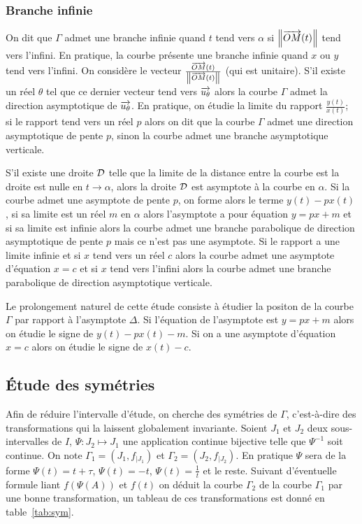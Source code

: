 \subsubsection{Branche infinie}

On dit que \(\Gamma\) admet une branche infinie quand \(t\) tend vers \(\alpha\)
si \(\left\lVert\overrightarrow{OM}(t)\right\rVert\) tend vers l'infini. En pratique, la courbe présente
une branche infinie quand \(x\) ou \(y\) tend vers l'infini. On considère le
vecteur \(\frac{\overrightarrow{OM}(t)}{\left\lVert\overrightarrow{OM}(t)\right\rVert}\) (qui est unitaire). S'il
existe un réel \(\theta\) tel que ce dernier vecteur tend vers
\(\overrightarrow{u_\theta}\) alors la courbe \(\Gamma\) admet la direction asymptotique
de \(\overrightarrow{u_\theta}\). En pratique, on étudie la limite du rapport
\(\frac{y(t)}{x(t)}\); si le rapport tend vers un réel \(p\) alors on dit que la
courbe \(\Gamma\) admet une direction asymptotique de pente \(p\), sinon la
courbe admet une branche asymptotique verticale.

S'il existe une droite \(\mathcal{D}\) telle que la limite de la distance entre la
courbe est la droite est nulle en \(t \to \alpha\), alors la droite \(\mathcal{D}\) est
asymptote à la courbe en \(\alpha\). Si la courbe admet une asymptote de pente
\(p\), on forme alors le terme \(y(t) - px(t)\), si sa limite est un réel \(m\)
en \(\alpha\) alors l'asymptote a pour équation \(y = px + m\) et si sa limite
est infinie alors la courbe admet une branche parabolique de direction
asymptotique de pente \(p\) mais ce n'est pas une asymptote. Si le rapport a une
limite infinie et si \(x\) tend vers un réel \(c\) alors la courbe admet une
asymptote d'équation \(x = c\) et si \(x\) tend vers l'infini alors la courbe
admet une branche parabolique de direction asymptotique verticale.

Le prolongement naturel de cette étude consiste à étudier la positon de la
courbe \(\Gamma\) par rapport à l'asymptote \(\Delta\). Si l'équation de
l'asymptote est \(y = px + m\) alors on étudie le signe de \(y(t) - px(t) - m\).
Si on a une asymptote d'équation \(x = c\) alors on étudie le signe de \(x(t) -
c\).

\subsection{Étude des symétries}

Afin de réduire l'intervalle d'étude, on cherche des symétries de \(\Gamma\),
c'est-à-dire des transformations qui la laissent globalement invariante. Soient
\(J_1\) et \(J_2\) deux sous-intervalles de \(I\), \(\Psi:J_2 \longmapsto J_1\)
une application continue bijective telle que \(\Psi^{-1}\) soit continue. On
note \(\Gamma_1 = (J_1, f_{|J_1})\) et \(\Gamma_2 = (J_2, f_{|J_2})\). En
pratique \(\Psi\) sera de la forme \(\Psi(t)=t + \tau\), \(\Psi(t)=-t\),
\(\Psi(t)=\frac{1}{t}\) et le reste. Suivant d'éventuelle formule liant
\(f(\Psi(A))\) et \(f(t)\) on déduit la courbe \(\Gamma_2\) de la courbe
\(\Gamma_1\) par une bonne transformation, un tableau de ces transformations est
donné en table~\ref{tab:sym}.

